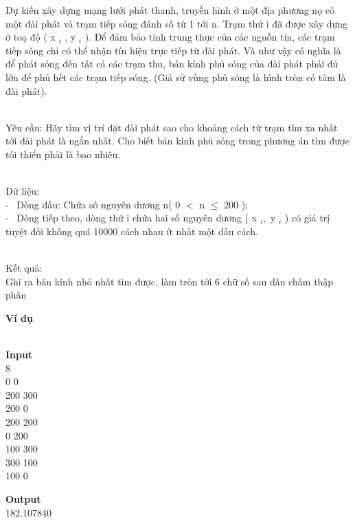 

Dự kiến xây dựng mạng lưới phát thanh, truyền hình ở một địa phương nọ có một đài phát và trạm tiếp sóng đánh số từ 1 tới n. Trạm thứ i đã được xây dựng ở toạ độ ( x $_ i $ , y $_ i $ ). Để đảm bảo tính trung thực của các nguồn tin, các trạm tiếp sóng chỉ có thể nhận tín hiệu trực tiếp từ đài phát. Và như vậy có nghĩa là để phát sóng đến tất cả các trạm thu, bán kính phủ sóng của đài phát phải đủ lớn để phủ hết các trạm tiếp sóng. (Giả sử vùng phủ sóng là hình tròn có tâm là đài phát).


\\Yêu cầu: Hãy tìm vị trí đặt đài phát sao cho khoảng cách từ trạm thu xa nhất tới đài phát là ngắn nhất. Cho biết bán kính phủ sóng trong phương án tìm được tối thiểu phải là bao nhiêu.


\\Dữ liệu:
\\-  Dòng đầu: Chứa số nguyên dương n( 0 $<$ n  $\le$  200 );
\\-  Dòng tiếp theo, dòng thứ i chứa hai số nguyên dương ( x $_ i , $ y $_ i $ ) có giá trị tuyệt đối không quá 10000 cách nhau ít nhất một dấu cách.


\\Kết quả:
\\Ghi ra bán kính nhỏ nhất tìm được, làm tròn tới 6 chữ số sau dấu chấm thập phân

\textbf{Ví dụ }


\\\textbf{Input}
\\8
\\0 0
\\200 300
\\200 0
\\200 200
\\0 200
\\100 300
\\300 100
\\100 0\textbf{}

\textbf{Output}
\\182.107840
